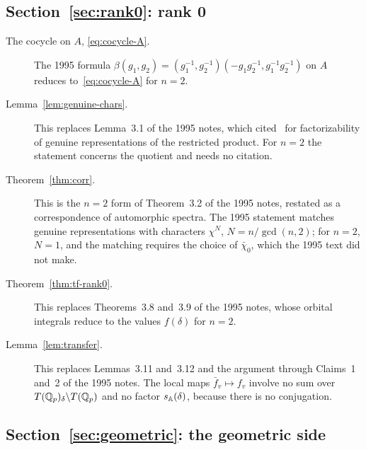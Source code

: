 \subsection{Section~\ref{sec:rank0}: rank 0}

\begin{description}
\item[The cocycle on $A$, \eqref{eq:cocycle-A}.] The 1995 formula $\beta(g_1,g_2)=(g_1^{-1},g_2^{-1})(-g_1g_2^{-1},g_1^{-1}g_2^{-1})$ on $A$ reduces to~\eqref{eq:cocycle-A} for $n=2$.

\item[Lemma~\ref{lem:genuine-chars}.] This replaces Lemma~3.1 of the 1995 notes, which cited~\cite{Ge2} for factorizability of genuine representations of the restricted product. For $n=2$ the statement concerns the quotient and needs no citation.

\item[Theorem~\ref{thm:corr}.] This is the $n=2$ form of Theorem~3.2 of the 1995 notes, restated as a correspondence of automorphic spectra. The 1995 statement matches genuine representations with characters $\chi^N$, $N=n/\gcd(n,2)$; for $n=2$, $N=1$, and the matching requires the choice of $\bar\chi_0$, which the 1995 text did not make.

\item[Theorem~\ref{thm:tf-rank0}.] This replaces Theorems~3.8 and~3.9 of the 1995 notes, whose orbital integrals reduce to the values $f(\delta)$ for $n=2$.

\item[Lemma~\ref{lem:transfer}.] This replaces Lemmas~3.11 and~3.12 and the argument through Claims~1 and~2 of the 1995 notes. The local maps $\bar f_v\mapsto f_v$ involve no sum over $T(\mathbb{Q}_p)_\delta\backslash T(\mathbb{Q}_p)$ and no factor $s_{\mathbb{A}}(\delta)$, because there is no conjugation.

\end{description}

\subsection{Section~\ref{sec:geometric}: the geometric side}

